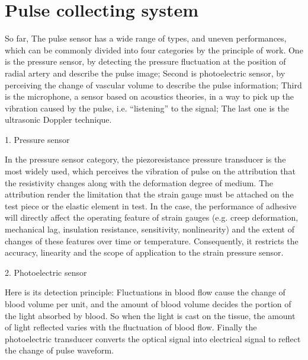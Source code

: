 \section{Pulse collecting system}
So far, The pulse sensor has a wide range of types,
and uneven performances, which can be commonly divided into four
categories by the principle of work. One is the pressure sensor, by
detecting the pressure fluctuation at the position of radial artery
and describe the pulse image; Second is photoelectric sensor, by 
perceiving the change of vascular volume to describe the pulse information;
Third is the microphone, a sensor based on acoustics theories, in a
way to pick up the vibration caused by the pulse, i.e.
``listening'' to the signal; The last one is the ultrasonic Doppler technique.
\par 1. Pressure sensor
\par In the pressure sensor category, the piezoresistance pressure transducer
is the most widely used, which perceives the vibration of pulse on the
attribution that the resistivity changes along with the deformation
degree of medium. The attribution render the limitation that the
strain gauge must be attached on the test piece or the elastic
element in test. In the case, the performance of adhesive will
directly affect the operating feature of strain gauges (e.g.
creep deformation, mechanical lag, insulation resistance, sensitivity,
nonlinearity) and the extent of changes of these features over time or
temperature. Consequently, it restricts the accuracy, linearity and the scope
of application to the strain pressure sensor.
\par 2. Photoelectric sensor 
\par Here is its detection principle: Fluctuations in blood flow
cause the change of blood volume per unit, and the amount of blood
volume decides the portion of the light absorbed by blood. So when the
light is cast on the tissue, the amount of light reflected varies with
the fluctuation of blood flow. Finally the photoelectric transducer
converts the optical signal into electrical signal to reflect the change
of pulse waveform. 


